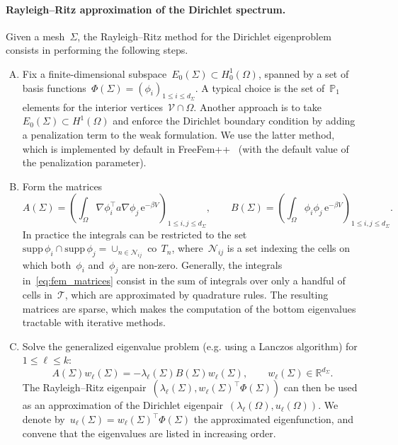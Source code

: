 \documentclass[a4]{article}
\newcommand{\e}{\mathrm{e}}
\renewcommand{\P}{\mathbb{P}}
\newcommand{\R}{\mathbb{R}}
\newcommand{\1}{\mathbbm 1}
\newcommand{\supp}{\mathrm{supp}}
\DeclareMathOperator{\co}{co}
\begin{document}
\paragraph{Rayleigh--Ritz approximation of the Dirichlet spectrum.}
    Given a mesh~$\Sigma$, the Rayleigh--Ritz method for the Dirichlet eigenproblem consists in performing the following steps.
    \label{alg:rayleigh_ritz}
    \begin{enumerate}[A.]
        \item{Fix a finite-dimensional subspace~$E_{0}(\Sigma)\subset H_{0}^1(\Omega)$, spanned by a set of basis functions~$\Phi(\Sigma)=\left(\phi_i\right)_{1\leq i\leq d_{\Sigma}}$. A typical choice is the set of~$\P_1$ elements for the interior vertices~$\mathcal V\cap \Omega$.
        Another approach is to take~$E_0(\Sigma) \subset H^1(\Omega)$ and enforce the Dirichlet boundary condition by adding a penalization term to the weak formulation. We use the latter method, which is implemented by default in FreeFem++~\cite{freefem} (with the default value of the penalization parameter).
        }
        \item{Form the matrices
        \begin{equation}
            \label{eq:fem_matrices}
            A(\Sigma) = \left(\int_{\Omega} \nabla\phi_i^\top a \nabla\phi_j\,\e^{-\beta V}\right)_{1\leq i,j\leq d_{\Sigma}},\qquad B(\Sigma) = \left(\int_{\Omega} \phi_i\phi_j\,\e^{-\beta V}\right)_{1\leq i,j\leq d_{\Sigma}}.
        \end{equation}
        In practice the integrals can be restricted to the set~$\supp\,\phi_i \cap \supp\,\phi_j = \cup_{n\in \mathcal N_{ij}}\co\, T_n$, where~$\mathcal N_{ij}$ is a set indexing the cells on which both~$\phi_i$ and~$\phi_j$ are non-zero. Generally, the integrals in~\eqref{eq:fem_matrices} consist in the sum of integrals over only a handful of cells in~$\mathcal T$, which are approximated by quadrature rules.
        The resulting matrices are sparse, which makes the computation of the bottom eigenvalues tractable with iterative methods.
        }
        \item{Solve the generalized eigenvalue problem (e.g. using a Lanczos algorithm) for~$1\leq\ell\leq k$:
        \begin{equation}
            \label{eq:fem_eigenvalues}
            A(\Sigma)w_\ell(\Sigma) = -\lambda_\ell(\Sigma)B(\Sigma)w_\ell(\Sigma),\qquad w_\ell(\Sigma)\in \R^{d_{\Sigma}}.
        \end{equation}
        The Rayleigh--Ritz eigenpair~$\left(\lambda_\ell(\Sigma),w_\ell(\Sigma)^\top \Phi(\Sigma)\right)$ can then be used as an approximation of the Dirichlet eigenpair~$(\lambda_\ell(\Omega),u_\ell(\Omega))$. We denote by~$u_\ell(\Sigma) = w_\ell(\Sigma)^\top \Phi(\Sigma)$ the approximated eigenfunction, and convene that the eigenvalues are listed in increasing order.
        }
    \end{enumerate}
\end{document}
